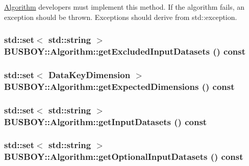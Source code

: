 \hyperlink{classBUSBOY_1_1Algorithm}{Algorithm} developers must implement this method. If the algorithm fails, an exception should be thrown. Exceptions should derive from std::exception. \hypertarget{classBUSBOY_1_1Algorithm_a43526f61b34780c903687cd01fb89ab5}{
\subsubsection[{getExcludedInputDatasets}]{\setlength{\rightskip}{0pt plus 5cm}std::set$<$ std::string $>$ BUSBOY::Algorithm::getExcludedInputDatasets () const}}
\label{classBUSBOY_1_1Algorithm_a43526f61b34780c903687cd01fb89ab5}
\hypertarget{classBUSBOY_1_1Algorithm_a803e451755d780c08aa3ebad3a94826d}{
\subsubsection[{getExpectedDimensions}]{\setlength{\rightskip}{0pt plus 5cm}std::set$<$ {\bf DataKeyDimension} $>$ BUSBOY::Algorithm::getExpectedDimensions () const}}
\label{classBUSBOY_1_1Algorithm_a803e451755d780c08aa3ebad3a94826d}
\hypertarget{classBUSBOY_1_1Algorithm_af4ca1a9d2b4fb1c14e148f6c0dac2584}{
\subsubsection[{getInputDatasets}]{\setlength{\rightskip}{0pt plus 5cm}std::set$<$ std::string $>$ BUSBOY::Algorithm::getInputDatasets () const}}
\label{classBUSBOY_1_1Algorithm_af4ca1a9d2b4fb1c14e148f6c0dac2584}
\hypertarget{classBUSBOY_1_1Algorithm_af5d25790065ea0fc6437320ce7f5611a}{
\subsubsection[{getOptionalInputDatasets}]{\setlength{\rightskip}{0pt plus 5cm}std::set$<$ std::string $>$ BUSBOY::Algorithm::getOptionalInputDatasets () const}}
